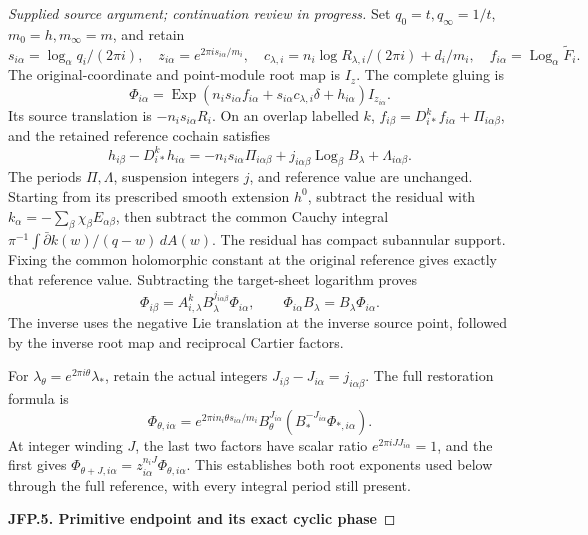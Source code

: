 \begin{proof}[Supplied source argument; continuation review in progress]
Set \(q_0=t,q_\infty=1/t\), \(m_0=h,m_\infty=m\), and retain
\[
 s_{i\alpha}=\log_\alpha q_i/(2\pi i),\quad
 z_{i\alpha}=e^{2\pi i s_{i\alpha}/m_i},\quad
 c_{\lambda,i}=n_i\log R_{\lambda,i}/(2\pi i)+d_i/m_i,
 \quad f_{i\alpha}=\operatorname{Log}_\alpha\widetilde F_i.
\tag{JFP.21}
\]
The original-coordinate and point-module root map is \(I_z\).
The complete gluing is
\[
 \Phi_{i\alpha}=\operatorname{Exp}
 (n_i s_{i\alpha}f_{i\alpha}+s_{i\alpha}c_{\lambda,i}\delta
       +h_{i\alpha})I_{z_{i\alpha}}.
\tag{JFP.22}
\]
Its source translation is \(-n_i s_{i\alpha}R_i\). On an
overlap labelled \(k\),
\(f_{i\beta}=D_{i*}^kf_{i\alpha}+\Pi_{i\alpha\beta}\), and
the retained reference cochain satisfies
\[
 h_{i\beta}-D_{i*}^kh_{i\alpha}
 =-n_i s_{i\alpha}\Pi_{i\alpha\beta}
   +j_{i\alpha\beta}\operatorname{Log}_\beta B_\lambda
   +\Lambda_{i\alpha\beta}.
\tag{JFP.23}
\]
The periods \(\Pi,\Lambda\), suspension integers \(j\), and
reference value are unchanged. Starting from its prescribed smooth
extension \(h^0\), subtract the residual with
\(k_\alpha=-\sum_\beta\chi_\beta E_{\alpha\beta}\), then
subtract the common Cauchy integral
\(\pi^{-1}\int\bar\partial k(w)/(q-w)\,dA(w)\).
The residual has compact subannular support. Fixing the common
holomorphic constant at the original reference gives exactly that
reference value. Subtracting the target-sheet logarithm proves
\[
 \Phi_{i\beta}=A_{i,\lambda}^{k}B_\lambda^{j_{i\alpha\beta}}
 \Phi_{i\alpha},\qquad \Phi_{i\alpha}B_\lambda=B_\lambda\Phi_{i\alpha}.
\tag{JFP.24}
\]
The inverse uses the negative Lie translation at the inverse
source point, followed by the inverse root map and reciprocal
Cartier factors.

For \(\lambda_\theta=e^{2\pi i\theta}\lambda_*\), retain the
actual integers \(J_{i\beta}-J_{i\alpha}=j_{i\alpha\beta}\).
The full restoration formula is
\[
 \Phi_{\theta,i\alpha}
 =e^{2\pi i n_i\theta s_{i\alpha}/m_i}
 B_\theta^{J_{i\alpha}}
 (B_*^{-J_{i\alpha}}\Phi_{*,i\alpha}).
\tag{JFP.25}
\]
At integer winding \(J\), the last two factors have scalar ratio
\(e^{2\pi iJ J_{i\alpha}}=1\), and the first gives
\(\Phi_{\theta+J,i\alpha}=z_{i\alpha}^{n_iJ}\Phi_{\theta,i\alpha}\).
This establishes both root exponents used below through the full
reference, with every integral period still present.

\par

\medskip\noindent\textbf{JFP.5. Primitive endpoint and its exact cyclic phase}

\par\nobreak


\end{proof}
